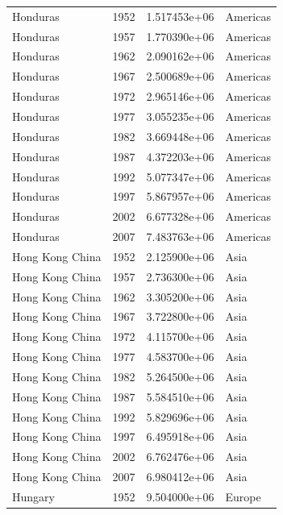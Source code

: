 \documentclass[
  letterpaper,
  DIV=11,
  numbers=noendperiod]{scrreprt}
\begin{document}
\begin{tcolorbox}
\begin{tabular}{lrrl}
Honduras                 &  1952 &  1.517453e+06 &  Americas \\
Honduras                 &  1957 &  1.770390e+06 &  Americas \\
Honduras                 &  1962 &  2.090162e+06 &  Americas \\
Honduras                 &  1967 &  2.500689e+06 &  Americas \\
Honduras                 &  1972 &  2.965146e+06 &  Americas \\
Honduras                 &  1977 &  3.055235e+06 &  Americas \\
Honduras                 &  1982 &  3.669448e+06 &  Americas \\
Honduras                 &  1987 &  4.372203e+06 &  Americas \\
Honduras                 &  1992 &  5.077347e+06 &  Americas \\
Honduras                 &  1997 &  5.867957e+06 &  Americas \\
Honduras                 &  2002 &  6.677328e+06 &  Americas \\
Honduras                 &  2007 &  7.483763e+06 &  Americas \\
Hong Kong China          &  1952 &  2.125900e+06 &      Asia \\
Hong Kong China          &  1957 &  2.736300e+06 &      Asia \\
Hong Kong China          &  1962 &  3.305200e+06 &      Asia \\
Hong Kong China          &  1967 &  3.722800e+06 &      Asia \\
Hong Kong China          &  1972 &  4.115700e+06 &      Asia \\
Hong Kong China          &  1977 &  4.583700e+06 &      Asia \\
Hong Kong China          &  1982 &  5.264500e+06 &      Asia \\
Hong Kong China          &  1987 &  5.584510e+06 &      Asia \\
Hong Kong China          &  1992 &  5.829696e+06 &      Asia \\
Hong Kong China          &  1997 &  6.495918e+06 &      Asia \\
Hong Kong China          &  2002 &  6.762476e+06 &      Asia \\
Hong Kong China          &  2007 &  6.980412e+06 &      Asia \\
Hungary                  &  1952 &  9.504000e+06 &    Europe \\

\end{tabular}
\end{tcolorbox}
\end{document}

